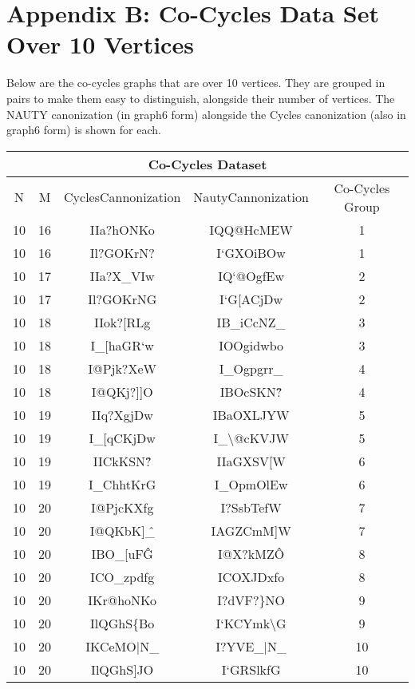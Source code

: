 \section{Appendix B: Co-Cycles Data Set Over 10 Vertices}

Below are the co-cycles graphs that are over 10 vertices.
They are grouped in pairs to make them easy to distinguish, alongside their number of vertices.
The NAUTY canonization (in graph6 form) alongside the Cycles canonization (also in graph6 form) is shown for each.

\begin{longtable}{ | c | c || c | c | c | }
\hline
\multicolumn{5}{|c|}{ Co-Cycles Dataset } \\
\hline
N & M & CyclesCannonization & NautyCannonization & Co-Cycles Group \\
\hline
\hline
\endhead
\hline
10 & 16 & IIa?hONKo & IQQ@HcMEW & 1 \\
10 & 16 & Il?GOKrN? & I`GXOiBOw & 1 \\
\hline
\hline
10 & 17 & IIa?X\_VIw & IQ`@OgfEw & 2 \\
10 & 17 & Il?GOKrNG & I`G[ACjDw & 2 \\
\hline
\hline
10 & 18 & IIok?[RLg & IB\_iCcNZ\_ & 3 \\
10 & 18 & I\_[haGR`w & IOOgidwbo & 3 \\
\hline
10 & 18 & I@Pjk?XeW & I\_Ogpgrr\_ & 4 \\
10 & 18 & I@QKj?]]O & IBOcSKN\^? & 4 \\
\hline
\hline
10 & 19 & IIq?XgjDw & IBaOXLJYW & 5 \\
10 & 19 & I\_[qCKjDw & I\_\textbackslash @cKVJW & 5 \\
\hline
10 & 19 & IICkKSN\^? & IIaGXSV[W & 6 \\
10 & 19 & I\_ChhtKrG & I\_OpmOlEw & 6 \\
\hline
\hline
10 & 20 & I@PjcKXfg & I?SsbTefW & 7 \\
10 & 20 & I@QKbK]\^\_ & IAGZCmM]W & 7 \\
\hline
10 & 20 & IBO\_[uF\^G & I@X?kMZ\^O & 8 \\
10 & 20 & ICO\_zpdfg & ICOXJDxfo & 8 \\
\hline
10 & 20 & IKr@hoNKo & I?dVF?\}NO & 9 \\
10 & 20 & IlQGhS\{Bo & I`KCYmk\textbackslash G & 9 \\
\hline
10 & 20 & IKCeMO|N\_ & I?YVE\_|N\_ & 10 \\
10 & 20 & IlQGhS]JO & I`GRSlkfG & 10 \\

\end{longtable}
